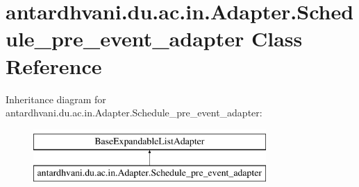 \hypertarget{classantardhvani_1_1du_1_1ac_1_1in_1_1_adapter_1_1_schedule__pre__event__adapter}{}\section{antardhvani.\+du.\+ac.\+in.\+Adapter.\+Schedule\+\_\+pre\+\_\+event\+\_\+adapter Class Reference}
\label{classantardhvani_1_1du_1_1ac_1_1in_1_1_adapter_1_1_schedule__pre__event__adapter}
Inheritance diagram for antardhvani.\+du.\+ac.\+in.\+Adapter.\+Schedule\+\_\+pre\+\_\+event\+\_\+adapter\+:\begin{figure}[H]
\begin{center}
\leavevmode
\includegraphics[height=2.000000cm]{classantardhvani_1_1du_1_1ac_1_1in_1_1_adapter_1_1_schedule__pre__event__adapter}
\end{center}
\end{figure}
